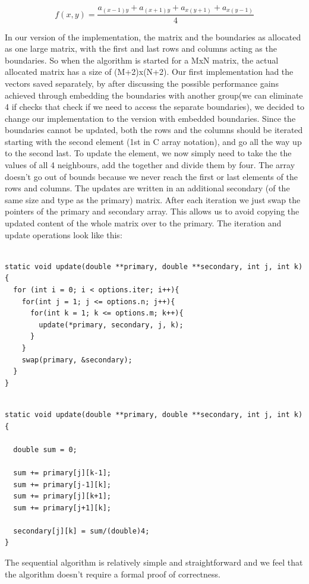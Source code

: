 \documentclass[11pt]{article}
\begin{document}
\[  f(x, y) = \frac{a_{(x-1)y} + a_{(x+1)y} + a_{x(y+1)} + a_{x(y-1)}}{4}  \]

In our version of the implementation, the matrix and the boundaries as allocated as one large matrix, with the first and last rows and columns acting
as the boundaries. So when the algorithm is started for a MxN matrix, the actual allocated matrix has a size of (M+2)x(N+2). Our first implementation had the vectors
saved separately, by after discussing the possible performance gains achieved through embedding the boundaries with another group(we can eliminate 4 if checks that check if we
need to access the separate boundaries), we decided to change our implementation to the version with embedded boundaries. Since the boundaries cannot be updated, both the rows and the columns
should be iterated starting with the second element (1st in C array notation), and go all the way up to the second last. To update the element, we now simply need to take the 
the values of all 4 neighbours, add the together and divide them by four. The array doesn't go out of bounds because we never reach the first or last elements of the rows and columns. 
The updates are written in an additional secondary (of the same size and type as the primary) matrix. After each iteration we just swap the pointers of the primary and secondary array. This
allows us to avoid copying the updated content of the whole matrix over to the primary.
The iteration and update operations look like this:
\begin{lstlisting}[label=some-code, caption=Iteration loop]

static void update(double **primary, double **secondary, int j, int k){
  for (int i = 0; i < options.iter; i++){
    for(int j = 1; j <= options.n; j++){
      for(int k = 1; k <= options.m; k++){
        update(*primary, secondary, j, k);
      }
    }
    swap(primary, &secondary);
  }
}
\end{lstlisting}
\begin{lstlisting}[label=some-code, caption=Update function]

static void update(double **primary, double **secondary, int j, int k){

  double sum = 0;

  sum += primary[j][k-1];
  sum += primary[j-1][k];
  sum += primary[j][k+1];
  sum += primary[j+1][k];

  secondary[j][k] = sum/(double)4;
}
\end{lstlisting}
The sequential algorithm is relatively simple and straightforward and we feel that the algorithm doesn't require a formal proof of correctness.
\end{document}
